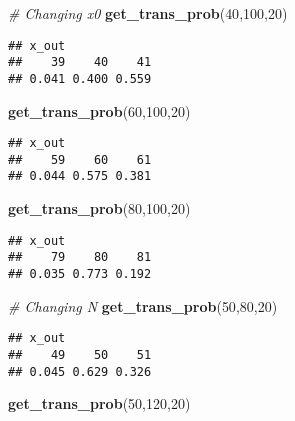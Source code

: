 \documentclass[
]{article}
\newenvironment{Shaded}{\begin{snugshade}}{\end{snugshade}}
\newcommand{\CommentTok}[1]{\textcolor[rgb]{0.56,0.35,0.01}{\textit{#1}}}
\newcommand{\DecValTok}[1]{\textcolor[rgb]{0.00,0.00,0.81}{#1}}
\newcommand{\FunctionTok}[1]{\textcolor[rgb]{0.13,0.29,0.53}{\textbf{#1}}}
\newcommand{\NormalTok}[1]{#1}
\begin{document}
\begin{Shaded}
\begin{Highlighting}[]
\CommentTok{\# Changing x0 }
\FunctionTok{get\_trans\_prob}\NormalTok{(}\DecValTok{40}\NormalTok{,}\DecValTok{100}\NormalTok{,}\DecValTok{20}\NormalTok{)}
\end{Highlighting}
\end{Shaded}

\begin{verbatim}
## x_out
##    39    40    41 
## 0.041 0.400 0.559
\end{verbatim}

\begin{Shaded}
\begin{Highlighting}[]
\FunctionTok{get\_trans\_prob}\NormalTok{(}\DecValTok{60}\NormalTok{,}\DecValTok{100}\NormalTok{,}\DecValTok{20}\NormalTok{)}
\end{Highlighting}
\end{Shaded}

\begin{verbatim}
## x_out
##    59    60    61 
## 0.044 0.575 0.381
\end{verbatim}

\begin{Shaded}
\begin{Highlighting}[]
\FunctionTok{get\_trans\_prob}\NormalTok{(}\DecValTok{80}\NormalTok{,}\DecValTok{100}\NormalTok{,}\DecValTok{20}\NormalTok{)}
\end{Highlighting}
\end{Shaded}

\begin{verbatim}
## x_out
##    79    80    81 
## 0.035 0.773 0.192
\end{verbatim}

\begin{Shaded}
\begin{Highlighting}[]
\CommentTok{\# Changing N}
\FunctionTok{get\_trans\_prob}\NormalTok{(}\DecValTok{50}\NormalTok{,}\DecValTok{80}\NormalTok{,}\DecValTok{20}\NormalTok{)}
\end{Highlighting}
\end{Shaded}

\begin{verbatim}
## x_out
##    49    50    51 
## 0.045 0.629 0.326
\end{verbatim}

\begin{Shaded}
\begin{Highlighting}[]
\FunctionTok{get\_trans\_prob}\NormalTok{(}\DecValTok{50}\NormalTok{,}\DecValTok{120}\NormalTok{,}\DecValTok{20}\NormalTok{)}
\end{Highlighting}
\end{Shaded}
\end{document}
